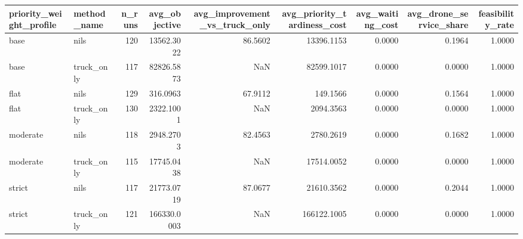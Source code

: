 \begin{tabular}{llrrrrrrr}
\toprule
priority_weight_profile & method_name & n_runs & avg_objective & avg_improvement_vs_truck_only & avg_priority_tardiness_cost & avg_waiting_cost & avg_drone_service_share & feasibility_rate \\
\midrule
base & nils & 120 & 13562.3022 & 86.5602 & 13396.1153 & 0.0000 & 0.1964 & 1.0000 \\
base & truck_only & 117 & 82826.5873 & NaN & 82599.1017 & 0.0000 & 0.0000 & 1.0000 \\
flat & nils & 129 & 316.0963 & 67.9112 & 149.1566 & 0.0000 & 0.1564 & 1.0000 \\
flat & truck_only & 130 & 2322.1001 & NaN & 2094.3563 & 0.0000 & 0.0000 & 1.0000 \\
moderate & nils & 118 & 2948.2703 & 82.4563 & 2780.2619 & 0.0000 & 0.1682 & 1.0000 \\
moderate & truck_only & 115 & 17745.0438 & NaN & 17514.0052 & 0.0000 & 0.0000 & 1.0000 \\
strict & nils & 117 & 21773.0719 & 87.0677 & 21610.3562 & 0.0000 & 0.2044 & 1.0000 \\
strict & truck_only & 121 & 166330.0003 & NaN & 166122.1005 & 0.0000 & 0.0000 & 1.0000 \\
\bottomrule
\end{tabular}
